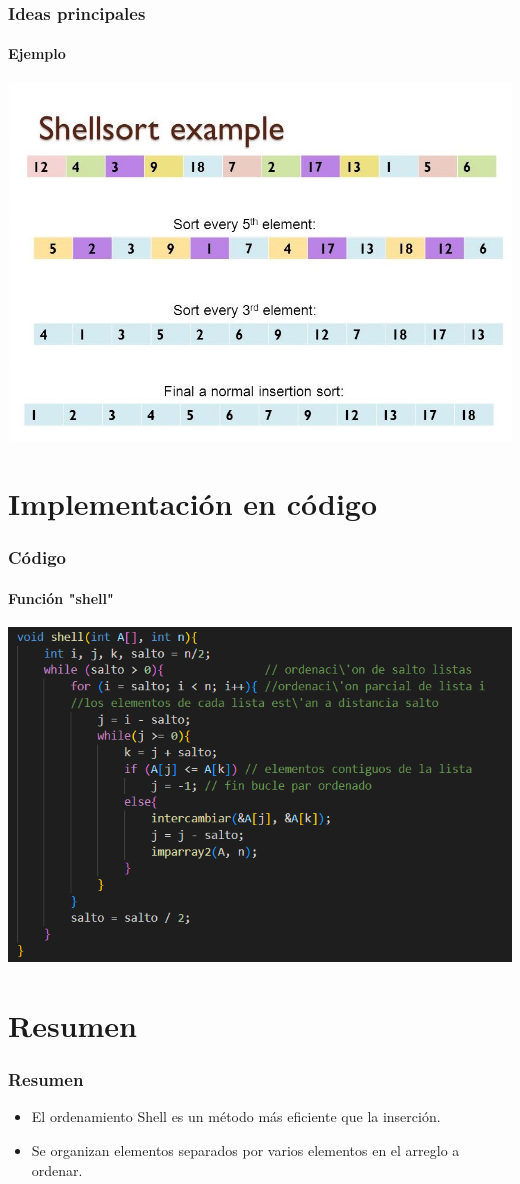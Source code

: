 \documentclass{beamer}
\begin{document}
\begin{frame}
  \frametitle{Ideas principales}
  \framesubtitle{Ejemplo}
  \begin{center}
 \includegraphics[scale=0.5]{ejemplo}
\end{center}
\end{frame}

\section{Implementaci\'on en c\'odigo}

\begin{frame}
  \frametitle{C\'odigo}
  \framesubtitle{Funci\'on "shell"}
  \begin{center}
 \includegraphics[scale=0.7]{code}
\end{center}
\end{frame}

\section*{Resumen}

\begin{frame}
  \frametitle{Resumen}

  \begin{itemize}
  \item {El ordenamiento Shell es un m\'etodo m\'as eficiente que la inserci\'on.}
  \item {Se organizan elementos separados por varios elementos en el arreglo a ordenar.}
  \end{itemize}
  
\end{frame}
\end{document}
